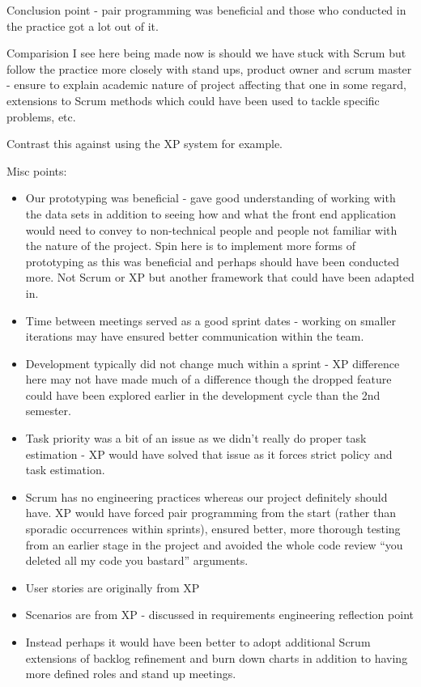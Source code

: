 \documentclass{l3proj}
\begin{document}
Conclusion point - pair programming was beneficial and those who conducted in the practice got a lot out of it.

Comparision I see here being made now is should we have stuck with Scrum but follow the practice more closely with stand ups, product owner and scrum master - ensure to explain academic nature of project affecting that one in some regard, extensions to Scrum methods which could have been used to tackle specific problems, etc.

Contrast this against using the XP system for example.

Misc points:
\begin{itemize}
\item Our prototyping was beneficial - gave good understanding of working with the data sets in addition to seeing how and what the front end application would need to convey to non-technical people and people not familiar with the nature of the project. Spin here is to implement more forms of prototyping as this was beneficial and perhaps should have been conducted more. Not Scrum or XP but another framework that could have been adapted in. 
\item Time between meetings served as a good sprint dates - working on smaller iterations may have ensured better communication within the team.
\item Development typically did not change much within a sprint - XP difference here may not have made much of a difference though the dropped feature could have been explored earlier in the development cycle than the 2nd semester.
\item Task priority was a bit of an issue as we didn’t really do proper task estimation - XP would have solved that issue as it forces strict policy and task estimation.
\item Scrum has no engineering practices whereas our project definitely should have. XP would have forced pair programming from the start (rather than sporadic occurrences within sprints), ensured better, more thorough testing from an earlier stage in the project and avoided the whole code review “you deleted all my code you bastard” arguments.
\item User stories are originally from XP 
\item Scenarios are from XP - discussed in requirements engineering reflection point 
\item Instead perhaps it would have been better to adopt additional Scrum extensions of backlog refinement and burn down charts in addition to having more defined roles and stand up meetings.

\end{itemize}
\end{document}
